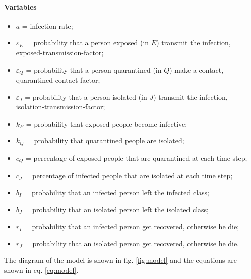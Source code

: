 \documentclass[12pt]{llncs}
\begin{document}
\paragraph{Variables}
\begin{itemize}
\item $a$ = infection rate;
\item $\varepsilon_E$ = probability that a person exposed (in $E$) transmit the infection, exposed-transmission-factor;
\item $\varepsilon_Q$ = probability that a person quarantined (in $Q$) make a contact, quarantined-contact-factor;
\item $\varepsilon_J$ = probability that a person isolated (in $J$) transmit the infection, isolation-transmission-factor;
\item $k_E$ = probability that exposed people become infective;
\item $k_Q$ = probability that quarantined people are isolated;
\item $c_Q$ = percentage of exposed people that are quarantined at each time step;
\item $c_J$ = percentage of infected people that are isolated at each time step;
\item $b_I$ = probability that an infected person left the infected class;
\item $b_J$ = probability that an isolated person left the isolated class;
\item $r_I$ = probability that an infected person get recovered, otherwise he die;
\item $r_J$ = probability that an isolated person get recovered, otherwise he die.
\end{itemize}
The diagram of the model is shown in fig. \ref{fig:model} and the equations are shown in eq. \ref{eq:model}.
\end{document}
